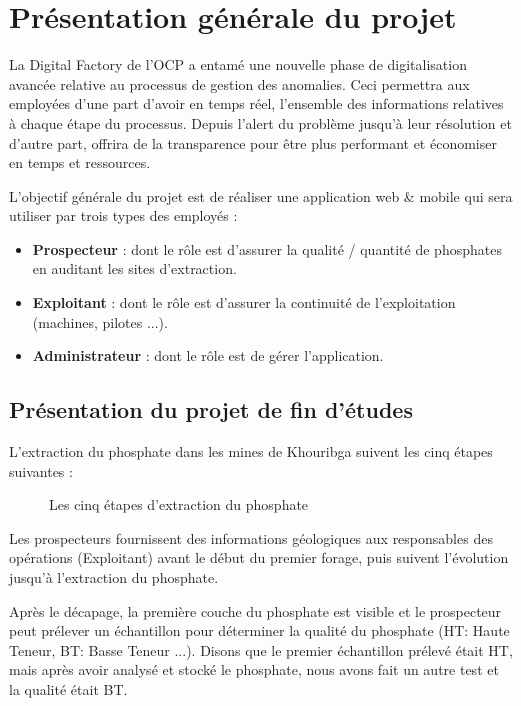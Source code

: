 \section{Pr\'esentation g\'en\'erale du projet}
La Digital Factory de l'\gls{OCP} a entam\'e une nouvelle phase de digitalisation avanc\'ee relative au processus de gestion des anomalies. Ceci permettra aux employ\'ees d'une part d'avoir en temps r\'eel, l'ensemble des informations relatives \`a chaque \'etape du processus. Depuis l'alert du probl\`eme jusqu'\`a leur r\'esolution et d'autre part, offrira de la transparence pour \^etre plus performant et \'economiser en temps et ressources.

L'objectif g\'en\'erale du projet est de r\'ealiser une application web \& mobile qui sera utiliser par trois types des employ\'es :
\begin{itemize}
\item \textbf{Prospecteur} : dont le r\^ole est d'assurer la qualit\'e / quantit\'e de phosphates en auditant les sites d'extraction.
\item \textbf{Exploitant} : dont le r\^ole est d'assurer la continuit\'e de l'exploitation (machines, pilotes ...).
\item \textbf{Administrateur} : dont le r\^ole est de g\'erer l'application. 
\end{itemize}
\subsection{Pr\'esentation du projet de fin d'\'etudes}
L'extraction du phosphate dans les mines de Khouribga suivent les cinq \'etapes suivantes :

\begin{figure}[!htb]
	\caption{\label{fig:my-label} Les cinq \'etapes d'extraction du phosphate}
\end{figure}

Les prospecteurs fournissent des informations g\'eologiques aux responsables des op\'erations (Exploitant) avant le d\'ebut du premier forage, puis suivent l'\'evolution jusqu'\`a l'extraction du phosphate.

Apr\`es le d\'ecapage, la premi\`ere couche du phosphate est visible et le prospecteur peut pr\'elever un \'echantillon pour d\'eterminer la qualit\'e du phosphate (HT: Haute Teneur, BT: Basse Teneur ...).
Disons que le premier \'echantillon pr\'elev\'e \'etait HT, mais apr\`es avoir analys\'e et stock\'e le phosphate, nous avons fait un autre test et la qualit\'e \'etait BT.

